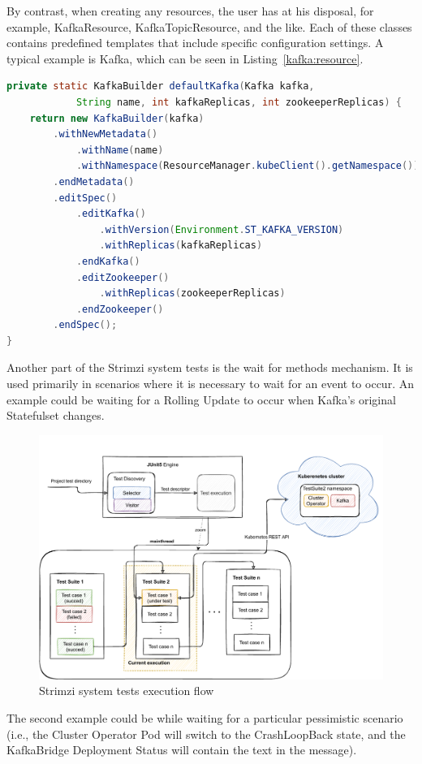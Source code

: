 By contrast, when creating any resources, the user has at his disposal, for example, KafkaResource, KafkaTopicResource, and the like.
Each of these classes contains predefined templates that include specific configuration settings.
A typical example is Kafka, which can be seen in Listing~\ref{kafka:resource}.

\begin{lstlisting}[language=Java,label=kafka:resource,caption=Default Kafka Custom Resource in KafkaResource\.class,frame=tb]
private static KafkaBuilder defaultKafka(Kafka kafka,
            String name, int kafkaReplicas, int zookeeperReplicas) {
    return new KafkaBuilder(kafka)
        .withNewMetadata()
            .withName(name)
            .withNamespace(ResourceManager.kubeClient().getNamespace())
        .endMetadata()
        .editSpec()
            .editKafka()
                .withVersion(Environment.ST_KAFKA_VERSION)
                .withReplicas(kafkaReplicas)
            .endKafka()
            .editZookeeper()
                .withReplicas(zookeeperReplicas)
            .endZookeeper()
        .endSpec();
}
\end{lstlisting}

Another part of the Strimzi system tests is the wait for methods mechanism.
It is used primarily in scenarios where it is necessary to wait for an event to occur.
An example could be waiting for a Rolling Update to occur when Kafka's original Statefulset changes. \begin{figure}[!ht]
    \centering
    \includegraphics[scale=0.70]{obrazky-figures/02-preliminaries/04-strimzi-system-tests/02d-strimzisystemtest-sequence-execution}
    \caption{Strimzi system tests execution flow}
    \label{02d:fig:strimzisysmtetest:execution}
\end{figure}
The second example could be while waiting for a particular pessimistic scenario (i.e., the Cluster Operator Pod will switch to the CrashLoopBack state, and the KafkaBridge Deployment Status will contain the text in the message).

